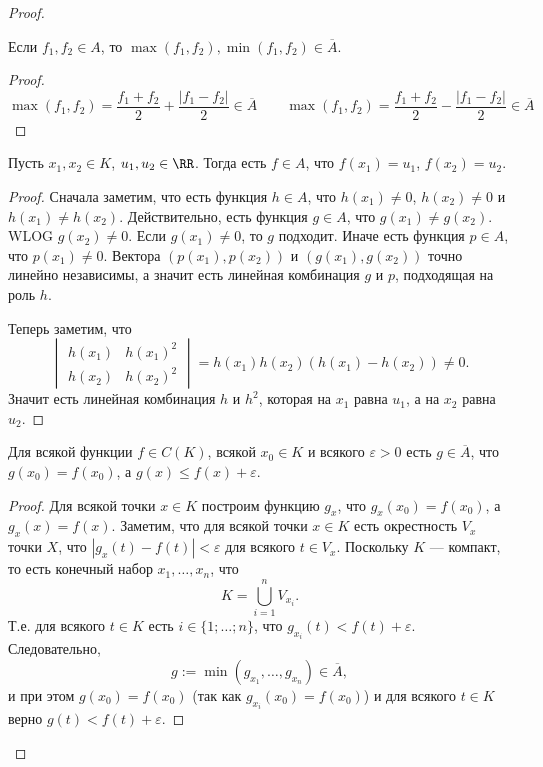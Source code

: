 \documentclass[12pt,a4paper]{article}
\begin{document}
\begin{proof}
        \begin{thlemma}
            Если $f_1, f_2 \in A$, то $\max(f_1, f_2), \min(f_1, f_2) \in \overline{A}$.
        \end{thlemma}

        \begin{proof}
            \[
                \max(f_1, f_2) = \frac{f_1 + f_2}{2} + \frac{|f_1 - f_2|}{2} \in \overline{A}
                \qquad
                \max(f_1, f_2) = \frac{f_1 + f_2}{2} - \frac{|f_1 - f_2|}{2} \in \overline{A}
            \]
        \end{proof}

        \begin{thlemma}
            Пусть $x_1, x_2 \in K$, $u_1, u_2 \in \RR$. Тогда есть $f \in A$, что $f(x_1) = u_1$, $f(x_2) = u_2$.
        \end{thlemma}

        \begin{proof}
            Сначала заметим, что есть функция $h \in A$, что $h(x_1) \neq 0$, $h(x_2) \neq 0$ и $h(x_1) \neq h(x_2)$. Действительно, есть функция $g \in A$, что $g(x_1) \neq g(x_2)$. WLOG $g(x_2) \neq 0$. Если $g(x_1) \neq 0$, то $g$ подходит. Иначе есть функция $p \in A$, что $p(x_1) \neq 0$. Вектора $(p(x_1), p(x_2))$ и $(g(x_1), g(x_2))$ точно линейно независимы, а значит есть линейная комбинация $g$ и $p$, подходящая на роль $h$.

            Теперь заметим, что
            \[
                \begin{vmatrix}
                    h(x_1)& h(x_1)^2\\
                    h(x_2)& h(x_2)^2
                \end{vmatrix}
                = h(x_1) h(x_2) (h(x_1) - h(x_2)) \neq 0.
            \]
            Значит есть линейная комбинация $h$ и $h^2$, которая на $x_1$ равна $u_1$, а на $x_2$ равна $u_2$.
        \end{proof}

        \begin{thlemma}
            Для всякой функции $f \in C(K)$, всякой $x_0 \in K$ и всякого $\varepsilon > 0$ есть $g \in \overline{A}$, что $g(x_0) = f(x_0)$, а $g(x) \leqslant f(x) + \varepsilon$.
        \end{thlemma}

        \begin{proof}
            Для всякой точки $x \in K$ построим функцию $g_x$, что $g_x(x_0) = f(x_0)$, а $g_x(x) = f(x)$. Заметим, что для всякой точки $x \in K$ есть окрестность $V_x$ точки $X$, что $|g_x(t) - f(t)| < \varepsilon$ для всякого $t \in V_x$. Поскольку $K$ --- компакт, то есть конечный набор $x_1, \dots, x_n$, что
            \[K = \bigcup_{i=1}^n V_{x_i}.\]
            Т.е. для всякого $t \in K$ есть $i \in \{1; \dots; n\}$, что $g_{x_i}(t) < f(t) + \varepsilon$. Следовательно,
            \[g := \min(g_{x_1}, \dots, g_{x_n}) \in \overline{A},\]
            и при этом $g(x_0) = f(x_0)$ (так как $g_{x_i}(x_0) = f(x_0)$) и для всякого $t \in K$ верно $g(t) < f(t) + \varepsilon$.
        \end{proof}


\end{proof}
\end{document}
